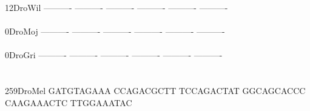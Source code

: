 \documentclass[11pt,twoside,reqno,a4paper]{article}
\begin{document}
{12\hspace*{3\charwidth}DroWil	----------	----------	----------	----------	----------	----------	\\
\hspace*{5\charwidth}\hspace*{7\charwidth}\hspace*{1\charwidth}\hspace*{1\charwidth}\hspace*{1\charwidth}\hspace*{1\charwidth}\hspace*{1\charwidth}\hspace*{1\charwidth}\\
0\hspace*{4\charwidth}DroMoj	----------	----------	----------	----------	----------	----------	\\
\hspace*{5\charwidth}\hspace*{7\charwidth}\hspace*{1\charwidth}\hspace*{1\charwidth}\hspace*{1\charwidth}\hspace*{1\charwidth}\hspace*{1\charwidth}\hspace*{1\charwidth}\\
0\hspace*{4\charwidth}DroGri	----------	----------	----------	----------	----------	----------	\\
\hspace*{5\charwidth}\hspace*{7\charwidth}\hspace*{1\charwidth}\hspace*{1\charwidth}\hspace*{1\charwidth}\hspace*{1\charwidth}\hspace*{1\charwidth}\hspace*{1\charwidth}\\
\\
259\hspace*{2\charwidth}DroMel	GATGTAGAAA	CCAGACGCTT	TCCAGACTAT	GGCAGCACCC	CAAGAAACTC	TTGGAAATAC	\\
\hspace*{5\charwidth}\hspace*{7\charwidth}\hspace*{1\charwidth}\hspace*{1\charwidth}\hspace*{1\charwidth}\hspace*{1\charwidth}\hspace*{1\charwidth}\hspace*{1\charwidth}\\
}
\end{document}
